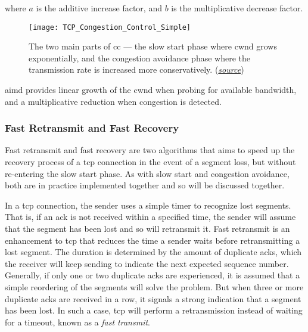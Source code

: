 where $a$ is the additive increase factor, and $b$ is the multiplicative decrease factor.

\begin{figure}[H]
    \centering
    \texttt{[image: TCP\_Congestion\_Control\_Simple]}
    \captionsetup{width=0.7\textwidth}
    \caption{The two main parts of \gls{cc} --- the slow start phase where \gls{cwnd} grows exponentially, and the congestion avoidance phase where the transmission rate is increased more conservatively. (\href{https://hpbn.co/building-blocks-of-tcp/}{\textit{source}})}
\end{figure}

\gls{aimd} provides linear growth of the \gls{cwnd} when probing for available bandwidth, and a multiplicative reduction when congestion is detected.









\subsubsection{Fast Retransmit and Fast Recovery}

Fast retransmit and fast recovery are two algorithms that aims to speed up the recovery process of a \gls{tcp} connection in the event of a segment loss, but without re-entering the slow start phase. As with slow start and congestion avoidance, both are in practice implemented together and so will be discussed together.

In a \gls{tcp} connection, the sender uses a simple timer to recognize lost segments. That is, if an \gls{ack} is not received within a specified time, the sender will assume that the segment has been lost and so will retransmit it. Fast retransmit is an enhancement to \gls{tcp} that reduces the time a sender waits before retransmitting a lost segment. The duration is determined by the amount of duplicate \gls{ack}s, which the receiver will keep sending to indicate the next expected sequence number. Generally, if only one or two duplicate \gls{ack}s are experienced, it is assumed that a simple reordering of the segments will solve the problem. But when three or more duplicate \gls{ack}s are received in a row, it signals a strong indication that a segment has been lost. In such a case, \gls{tcp} will perform a retransmission instead of waiting for a timeout, known as a \textit{fast transmit}.

